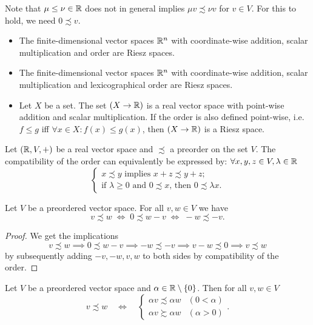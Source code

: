 Note that $\mu \leq \nu \in \mathbb{R}$ does not in general implies $\mu v \precsim \nu v$ for $v\in V$. For this to hold, we need $0\precsim v$.

\begin{example}
\begin{itemize}
\item The finite-dimensional vector spaces $\mathbb{R}^n$ with coordinate-wise addition, scalar multiplication and order are Riesz spaces.
\item The finite-dimensional vector spaces $\mathbb{R}^n$ with coordinate-wise addition, scalar multiplication and lexicographical order are Riesz spaces.
\item Let $X$ be a set. The set $(X\to \mathbb{R})$ is a real vector space with point-wise addition and scalar multiplication. If the order is also defined point-wise, i.e.\ $f \leq g$ iff $\forall x\in X: f(x) \leq g(x)$, then $(X\to \mathbb{R})$ is a Riesz space.
\end{itemize}
\end{example}

\begin{lemma} \label{positiveConeOrderCharacterisation}
Let $\sSet{\R, V, +}$ be a real vector space and $\precsim$ a preorder on the set $V$. The compatibility of the order can equivalently be expressed by:
$\forall x,y,z\in V, \lambda\in\mathbb{R}$
\[ \begin{cases}
\text{$x \precsim y$ implies $x+z \precsim y+z$;} \\
\text{if $\lambda\geq 0$ and $0 \precsim x$, then $0 \precsim \lambda x$.}
\end{cases} \]
\end{lemma}

\begin{lemma} \label{elementaryVectorPreorderManipulations}
Let $V$ be a preordered vector space. For all $v,w \in V$ we have
\[ v \precsim w \;\iff\; 0 \precsim  w - v \;\iff\; -w \precsim -v.  \]
\end{lemma}
\begin{proof}
We get the implications
\[ v \precsim w \implies 0 \precsim  w - v \implies -w \precsim -v \implies v-w \precsim 0 \implies v\precsim w \]
by subsequently adding $-v, -w, v,w$ to both sides by compatibility of the order.
\end{proof}
\begin{corollary} \label{orderPreservationReversalScalarMultiplication}
Let $V$ be a preordered vector space and $\alpha \in \mathbb{R}\setminus\{0\}$. Then for all $v,w\in V$
\[ v \precsim w \quad \iff \quad \begin{cases}
\alpha v \precsim \alpha w & (0 < \alpha) \\
\alpha v \succsim \alpha w & (\alpha > 0)
\end{cases}. \] 
\end{corollary}

